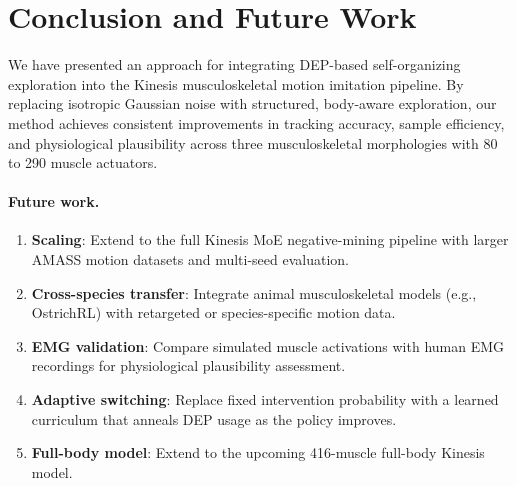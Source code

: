 \documentclass[10pt,twocolumn]{article}
\begin{document}
\section{Conclusion and Future Work}
\label{sec:conclusion}

We have presented an approach for integrating DEP-based self-organizing exploration into the Kinesis musculoskeletal motion imitation pipeline. By replacing isotropic Gaussian noise with structured, body-aware exploration, our method achieves consistent improvements in tracking accuracy, sample efficiency, and physiological plausibility across three musculoskeletal morphologies with 80 to 290 muscle actuators.

\paragraph{Future work.}
\begin{enumerate}[nosep, leftmargin=*]
\item \textbf{Scaling}: Extend to the full Kinesis MoE negative-mining pipeline with larger AMASS motion datasets and multi-seed evaluation.
\item \textbf{Cross-species transfer}: Integrate animal musculoskeletal models (e.g., OstrichRL) with retargeted or species-specific motion data.
\item \textbf{EMG validation}: Compare simulated muscle activations with human EMG recordings for physiological plausibility assessment.
\item \textbf{Adaptive switching}: Replace fixed intervention probability with a learned curriculum that anneals DEP usage as the policy improves.
\item \textbf{Full-body model}: Extend to the upcoming 416-muscle full-body Kinesis model.
\end{enumerate}
\end{document}
